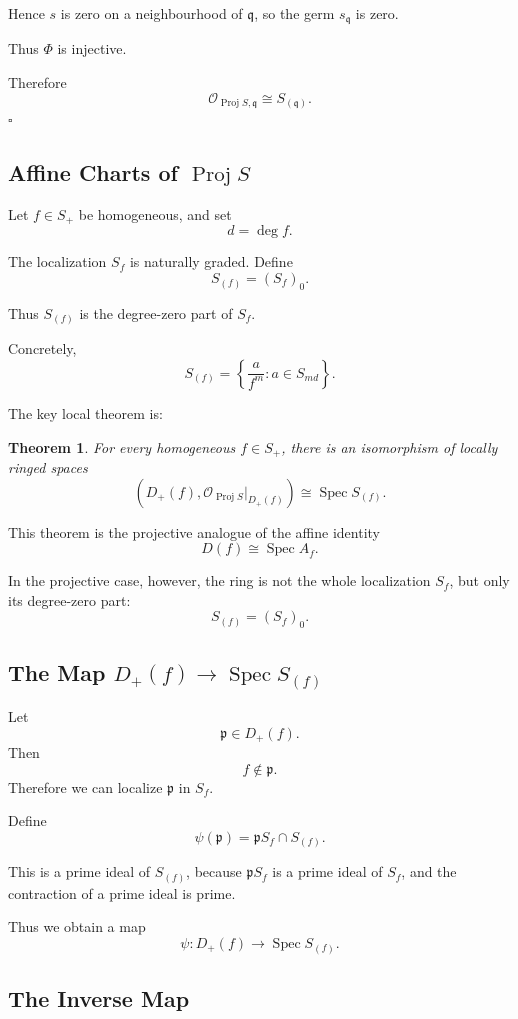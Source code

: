 \documentclass[12pt,a4paper]{article}
\DeclareMathOperator{\Spec}{Spec}
\DeclareMathOperator{\Proj}{Proj}
\newtheorem{theorem}{Theorem}[section]
\theoremstyle{notespace}
\begin{document}
Hence \(s\) is zero on a neighbourhood of \(\mathfrak q\), so the germ \(s_{\mathfrak q}\)
is zero.

Thus \(\Phi\) is injective.

Therefore
\[
\mathcal O_{\Proj S,\mathfrak q}
\cong
S_{(\mathfrak q)}.
\]
\(\square\)

\subsection{Affine Charts of \texorpdfstring{$\Proj S$}{Proj S}}

Let \(f\in S_+\) be homogeneous, and set
\[
d=\deg f.
\]

The localization \(S_f\) is naturally graded. Define
\[
S_{(f)}=(S_f)_0.
\]

Thus \(S_{(f)}\) is the degree-zero part of \(S_f\).

Concretely,
\[
S_{(f)}
=
\left\{
\frac{a}{f^m}:
a\in S_{md}
\right\}.
\]

The key local theorem is:

\begin{theorem}
	For every homogeneous \(f\in S_+\), there is an isomorphism of locally ringed spaces
	\[
	\left(D_+(f),\mathcal O_{\Proj S}|_{D_+(f)}\right)
	\cong
	\Spec S_{(f)}.
	\]
\end{theorem}

This theorem is the projective analogue of the affine identity
\[
D(f)\cong \Spec A_f.
\]

In the projective case, however, the ring is not the whole localization \(S_f\), but only
its degree-zero part:
\[
S_{(f)}=(S_f)_0.
\]

\subsection{The Map \texorpdfstring{$D_+(f)\to\Spec S_{(f)}$}{D+(f) to Spec S(f)}}

Let
\[
\mathfrak p\in D_+(f).
\]
Then
\[
f\notin\mathfrak p.
\]
Therefore we can localize \(\mathfrak p\) in \(S_f\).

Define
\[
\psi(\mathfrak p)
=
\mathfrak pS_f\cap S_{(f)}.
\]

This is a prime ideal of \(S_{(f)}\), because \(\mathfrak pS_f\) is a prime ideal of \(S_f\),
and the contraction of a prime ideal is prime.

Thus we obtain a map
\[
\psi:D_+(f)\longrightarrow \Spec S_{(f)}.
\]

\subsection{The Inverse Map}
\end{document}
